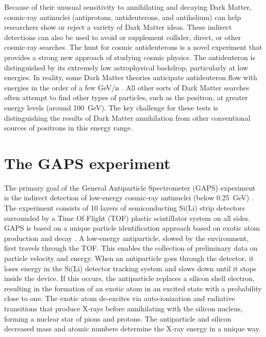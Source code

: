 \noindent
Because of their unusual sensitivity to annihilating and decaying Dark Matter, cosmic-ray antinuclei (antiprotons, antideuterons, and antihelium) can help researchers show or reject a variety of Dark Matter ideas. These indirect detections can also be used to avoid or supplement collider, direct, or other cosmic-ray searches. The hunt for cosmic antideuterons is a novel experiment that provides a strong new approach of studying cosmic physics. The antideuteron is distinguished by its extremely low astrophysical backdrop, particularly at low energies. In reality, some Dark Matter theories anticipate antideuteron flow with energies in the order of a few GeV/n \cite{doetinchem_2020_cosmicray}. All other sorts of Dark Matter searches often attempt to find other types of particles, such as the positron, at greater energy levels (around \SI{100}{\giga\electronvolt}). The key challenge for these tests is distinguishing the results of Dark Matter annihilation from other conventional sources of positrons in this energy range.


\section{The GAPS experiment}
\label{appendixGAPSexperiment}
The primary goal of the General Antiparticle Spectrometer (GAPS) experiment is the indirect detection of low-energy cosmic-ray antinuclei (below \SI{0.25}{\giga\electronvolt}) \cite{doetinchem_2020_cosmicray}. The experiment consists of 10 layers of semiconducting Si(Li) strip detectors surrounded by a Time Of Flight (TOF) plastic scintillator system on all sides. GAPS is based on a unique particle identification approach based on exotic atom production and decay \cite{re_2022_a}\cite{re_2022_b}. A low-energy antiparticle, slowed by the environment, first travels through the TOF. This enables the collection of preliminary data on particle velocity and energy. When an antiparticle goes through the detector, it loses energy in the Si(Li) detector tracking system and slows down until it stops inside the device. If this occurs, the antiparticle replaces a silicon shell electron, resulting in the formation of an exotic atom in an excited state with a probability close to one. The exotic atom de-excites via auto-ionization and radiative transitions that produce X-rays before annihilating with the silicon nucleus, forming a nuclear star of pions and protons. The antiparticle and silicon decreased mass and atomic numbers determine the X-ray energy in a unique way.


